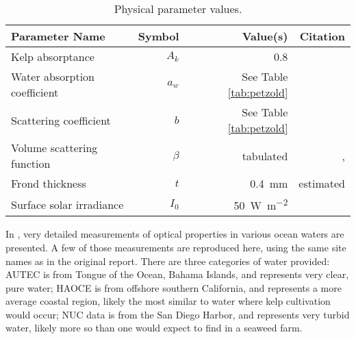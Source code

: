 \begin{table}
  \centering
  \caption{Physical parameter values.}
  \begin{tabular}{lrrr}
    \toprule
    Parameter Name & Symbol & Value(s) & Citation \\ %
    \midrule
    Kelp absorptance & $A_k$ & 0.8 & \cite{colombo-pallotta_photosynthetic_2006} \\%
    Water absorption coefficient & $a_w$ & See Table \ref{tab:petzold} & \cite{petzold_volume_1972} \\%
    Scattering coefficient & $b$  & See Table \ref{tab:petzold} & \cite{petzold_volume_1972} \\%
    Volume scattering function & $\beta$ & tabulated & \cite{petzold_volume_1972,sokolov_parameterization_2010}, \\%
    Frond thickness & $t$ & \SI{0.4}{\mm} & estimated \\
    Surface solar irradiance & $I_0$ & \SI{50}{\W\per\m\squared} & \cite{broch_modelling_2012}  \\%
    \bottomrule
  \end{tabular}
  \label{tab:params}
\end{table}

In \citep{petzold_volume_1972}, very detailed measurements of optical properties in various ocean waters are presented.
A few of those measurements are reproduced here, using the same site names as in the original report.
There are three categories of water provided: AUTEC is from Tongue of the Ocean, Bahama Islands,
and represents very clear, pure water; HAOCE is from offshore southern California, and represents a more average coastal region,
likely the most similar to water where kelp cultivation would occur; NUC data is from the San Diego Harbor, and represents very turbid water,
likely more so than one would expect to find in a seaweed farm.

